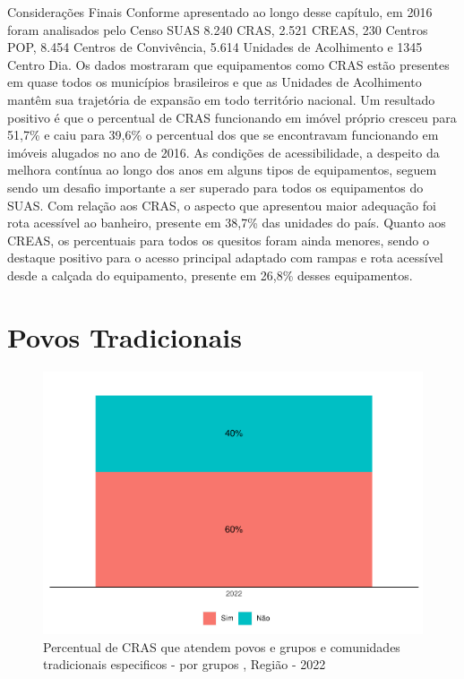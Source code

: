 \documentclass[
  brazilian]{report}
\begin{document}
Considerações Finais Conforme apresentado ao longo desse capítulo, em
2016 foram analisados pelo Censo SUAS 8.240 CRAS, 2.521 CREAS, 230
Centros POP, 8.454 Centros de Convivência, 5.614 Unidades de Acolhimento
e 1345 Centro Dia. Os dados mostraram que equipamentos como CRAS estão
presentes em quase todos os municípios brasileiros e que as Unidades de
Acolhimento mantêm sua trajetória de expansão em todo território
nacional. Um resultado positivo é que o percentual de CRAS funcionando
em imóvel próprio cresceu para 51,7\% e caiu para 39,6\% o percentual
dos que se encontravam funcionando em imóveis alugados no ano de 2016.
As condições de acessibilidade, a despeito da melhora contínua ao longo
dos anos em alguns tipos de equipamentos, seguem sendo um desafio
importante a ser superado para todos os equipamentos do SUAS. Com
relação aos CRAS, o aspecto que apresentou maior adequação foi rota
acessível ao banheiro, presente em 38,7\% das unidades do país. Quanto
aos CREAS, os percentuais para todos os quesitos foram ainda menores,
sendo o destaque positivo para o acesso principal adaptado com rampas e
rota acessível desde a calçada do equipamento, presente em 26,8\% desses
equipamentos.

\hypertarget{povos-tradicionais}{%
\section{Povos Tradicionais}\label{povos-tradicionais}}

\begin{figure}
\includegraphics{Censo-SUAS-2022_files/figure-latex/povos-tradicionais_cras-1} \caption[Percentual de CRAS que atendem povos e grupos e comunidades tradicionais especificos -  por grupos , Região - 2022]{Percentual de CRAS que atendem povos e grupos e comunidades tradicionais especificos -  por grupos , Região - 2022}\label{fig:povos-tradicionais_cras}
\end{figure}
\end{document}
